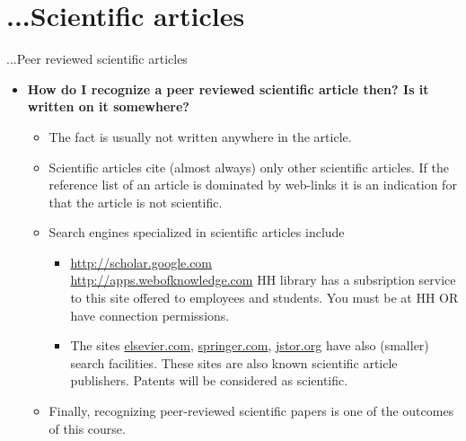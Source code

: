 \documentclass[pdf]{beamer}
\begin{document}
\section{...Scientific articles} 
\begin{frame}{...Peer reviewed scientific articles}
\begin{itemize}
\item {\bf How do I recognize a peer reviewed scientific article then?  Is it written on it somewhere?}  \\
\begin{itemize}
\item  The fact is usually not written anywhere in the article.
\item Scientific articles cite (almost always) only other scientific
  articles. If the reference list of an article is dominated by
  web-links it is an indication for that the article is not
scientific. 
\item    Search engines specialized in scientific articles include
       \begin{itemize}
       \item     \url{http://scholar.google.com} \\
         \url{http://apps.webofknowledge.com}  HH library has a subsription
         service to this site offered to employees and students. You
         must be at HH OR 
          have connection permissions.
\item The sites \url{elsevier.com}, \url{springer.com}, \url{jstor.org} have
also (smaller) search facilities. These sites are also known
scientific article publishers. Patents will be considered as scientific.
\end{itemize}
\item Finally, recognizing peer-reviewed scientific papers is one of the
  outcomes of this course.
\end{itemize}
\end{itemize}
\end{frame}



\end{document}
